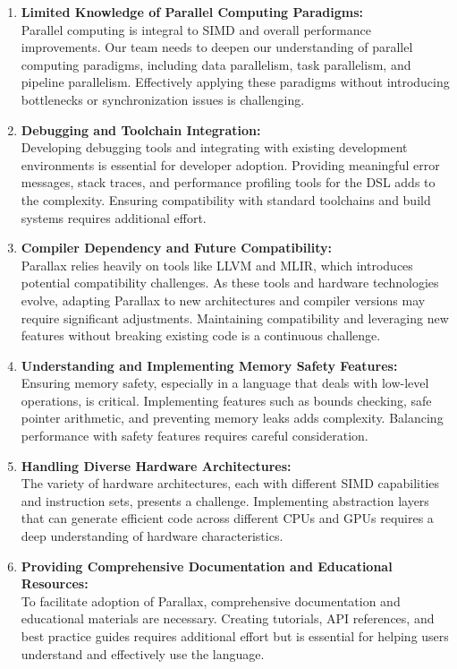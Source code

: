 \documentclass[12pt,a4paper]{article}
\begin{document}
\begin{enumerate}
    \item \textbf{Limited Knowledge of Parallel Computing Paradigms:} \\
    Parallel computing is integral to SIMD and overall performance improvements. Our team needs to deepen our understanding of parallel computing paradigms, including data parallelism, task parallelism, and pipeline parallelism. Effectively applying these paradigms without introducing bottlenecks or synchronization issues is challenging.

    \item \textbf{Debugging and Toolchain Integration:} \\
    Developing debugging tools and integrating with existing development environments is essential for developer adoption. Providing meaningful error messages, stack traces, and performance profiling tools for the DSL adds to the complexity. Ensuring compatibility with standard toolchains and build systems requires additional effort.

    \item \textbf{Compiler Dependency and Future Compatibility:} \\
    Parallax relies heavily on tools like LLVM and MLIR, which introduces potential compatibility challenges. As these tools and hardware technologies evolve, adapting Parallax to new architectures and compiler versions may require significant adjustments. Maintaining compatibility and leveraging new features without breaking existing code is a continuous challenge.

    \item \textbf{Understanding and Implementing Memory Safety Features:} \\
    Ensuring memory safety, especially in a language that deals with low-level operations, is critical. Implementing features such as bounds checking, safe pointer arithmetic, and preventing memory leaks adds complexity. Balancing performance with safety features requires careful consideration.

    \item \textbf{Handling Diverse Hardware Architectures:} \\
    The variety of hardware architectures, each with different SIMD capabilities and instruction sets, presents a challenge. Implementing abstraction layers that can generate efficient code across different CPUs and GPUs requires a deep understanding of hardware characteristics.

    \item \textbf{Providing Comprehensive Documentation and Educational Resources:} \\
    To facilitate adoption of Parallax, comprehensive documentation and educational materials are necessary. Creating tutorials, API references, and best practice guides requires additional effort but is essential for helping users understand and effectively use the language.


\end{enumerate}
\end{document}
